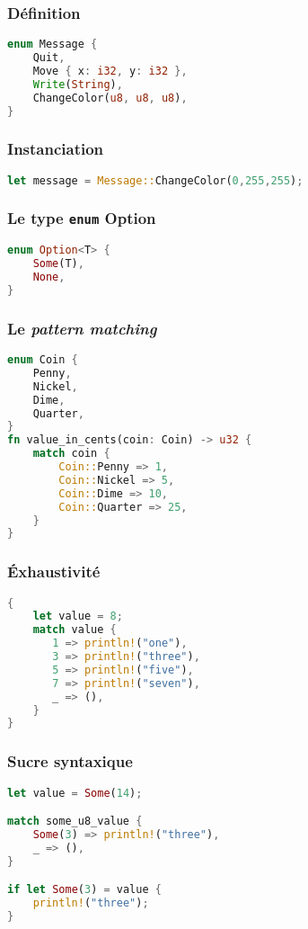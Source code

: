 \begin{frame}[fragile]
  \frametitle{Définition}
  \begin{lstlisting}[language=rust]
enum Message {
    Quit,
    Move { x: i32, y: i32 },
    Write(String),
    ChangeColor(u8, u8, u8),
}
  \end{lstlisting}
\end{frame}

\begin{frame}[fragile]
  \frametitle{Instanciation}
  \begin{lstlisting}[language=rust]
let message = Message::ChangeColor(0,255,255);
  \end{lstlisting}
\end{frame}

\begin{frame}[fragile]
  \frametitle{Le type \texttt{enum} Option}
  \begin{lstlisting}[language=rust]
enum Option<T> {
    Some(T),
    None,
}
  \end{lstlisting}
\end{frame}

\begin{frame}[fragile]
  \frametitle{Le \textit{pattern matching}}
  \begin{lstlisting}[language=rust, basicstyle=\small{}]
enum Coin {
    Penny,
    Nickel,
    Dime,
    Quarter,
}
fn value_in_cents(coin: Coin) -> u32 {
    match coin {
        Coin::Penny => 1,
        Coin::Nickel => 5,
        Coin::Dime => 10,
        Coin::Quarter => 25,
    }
}
  \end{lstlisting}
\end{frame}

\begin{frame}[fragile]
  \frametitle{Éxhaustivité}
  \begin{lstlisting}[language=rust]
{
    let value = 8;
    match value {
       1 => println!("one"),
       3 => println!("three"),
       5 => println!("five"),
       7 => println!("seven"),
       _ => (),
    }
}
  \end{lstlisting}
\end{frame}


\begin{frame}[fragile]
  \frametitle{Sucre syntaxique}
  \begin{lstlisting}[language=rust]
let value = Some(14);

match some_u8_value {
    Some(3) => println!("three"),
    _ => (),
}

if let Some(3) = value {
    println!("three");
}
  \end{lstlisting}
\end{frame}

